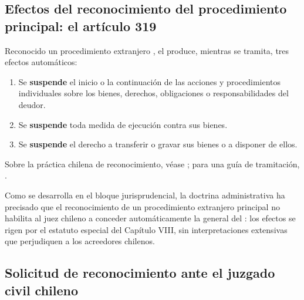 \subsection{Efectos del reconocimiento del procedimiento principal: el artículo 319}

Reconocido un procedimiento extranjero , el  produce, mientras se
tramita, tres efectos automáticos:

\begin{enumerate}
  \item Se \textbf{suspende} el inicio o la continuación de las acciones y procedimientos
  individuales sobre los bienes, derechos, obligaciones o responsabilidades del deudor.
  \item Se \textbf{suspende} toda medida de ejecución contra sus bienes.
  \item Se \textbf{suspende} el derecho a transferir o gravar sus bienes o a disponer de
  ellos.
\end{enumerate}

Sobre la práctica chilena de reconocimiento, véase \textcite{doc-reconocimiento-extranjero};
para una guía de tramitación, \textcite{doc-transfronteriza-guia}.

\begin{alerta}
Como se desarrolla en el bloque jurisprudencial, la doctrina administrativa ha precisado que
el reconocimiento de un procedimiento extranjero principal no habilita al juez chileno a
conceder automáticamente la \pfc{} general del  : los efectos se rigen por el
estatuto especial del Capítulo VIII, sin interpretaciones extensivas que perjudiquen a los
acreedores chilenos.
\end{alerta}

\bloquePractico

\subsection{Solicitud de reconocimiento ante el juzgado civil chileno}

